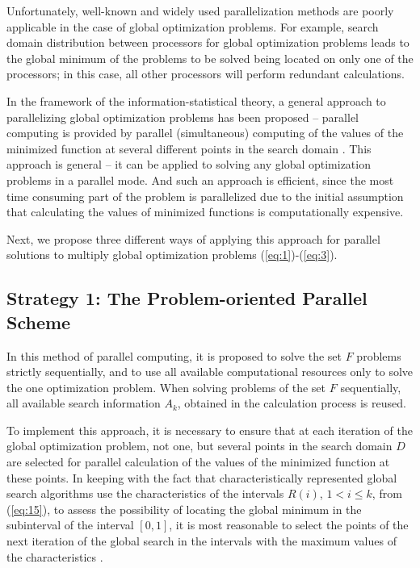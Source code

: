 \documentclass[review]{elsarticle}
\begin{document}
Unfortunately, well-known and widely used parallelization methods are poorly applicable in the case of global optimization problems. For example, search domain distribution between processors for global optimization problems leads to the global minimum of the problems to be solved being located on only one of the processors; in this case, all other processors will perform redundant calculations.

In the framework of the information-statistical theory, a general approach to parallelizing global optimization problems has been proposed -- parallel computing is provided by parallel (simultaneous) computing of the values of the minimized function at several different points in the search domain \cite{c5}. This approach is general -- it can be applied to solving any global optimization problems in a parallel mode. And such an approach is efficient, since the most time consuming part of the problem is parallelized due to the initial assumption that calculating the values of minimized functions is computationally expensive.

Next, we propose three different ways of applying this approach for parallel solutions to multiply global optimization problems (\ref{eq:1})-(\ref{eq:3}).


\subsection{Strategy 1: The Problem-oriented Parallel Scheme} \label{subsec:1}

In this method of parallel computing, it is proposed to solve the set $F$ problems strictly sequentially, and to use all available computational resources only to solve the one optimization problem. When solving problems of the set $F$ sequentially, all available search information $A_k$, obtained in the calculation process is reused. 

To implement this approach, it is necessary to ensure that at each iteration of the global optimization problem, not one, but several points in the search domain $D$ are selected for parallel calculation of the values of the minimized function at these points. In keeping with the fact that characteristically represented global search algorithms use the characteristics of the intervals $R(i)$, $1 < i \leq k$, from (\ref{eq:15}), to assess the possibility of locating the global minimum in the subinterval of the interval $[0,1]$, it is most reasonable to select the points of the next iteration of the global search in the intervals with the maximum values of the characteristics \cite{c33,c34,c35}.
\end{document}
